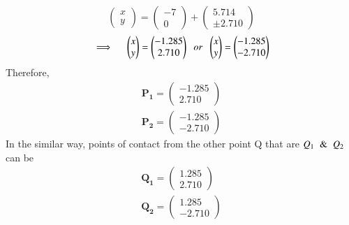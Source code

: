 \documentclass[journal,10pt,twocolumn]{article}
\let\vec\mathbf
\newcommand{\myvec}[1]{\ensuremath{\begin{pmatrix}#1\end{pmatrix}}}
\begin{document}
\begin{equation}
\myvec{x \\ y} = \myvec{-7 \\ 0}+\myvec{5.714 \\ \pm 2.710}
\end{equation}
\begin{equation}
\implies \hspace{4mm} \myvec{x \\ y} = \myvec{-1.285 \\ 2.710} \hspace{2mm} or \hspace{2mm} \myvec{x \\ y} = \myvec{-1.285 \\ -2.710}
\end{equation}
Therefore,
\begin{align*}
\vec{P_1} = \myvec{-1.285 \\ 2.710} \\
\vec{P_2} = \myvec{-1.285 \\ -2.710}
\end{align*}
In the similar way, points of contact from the other point Q that are $Q_1 \hspace{2mm} \& \hspace{2mm} Q_2$ can be
\begin{align*}
\vec{Q_1} = \myvec{1.285 \\ 2.710} \\
\vec{Q_2} = \myvec{1.285 \\ -2.710}
\end{align*}
\end{document}
